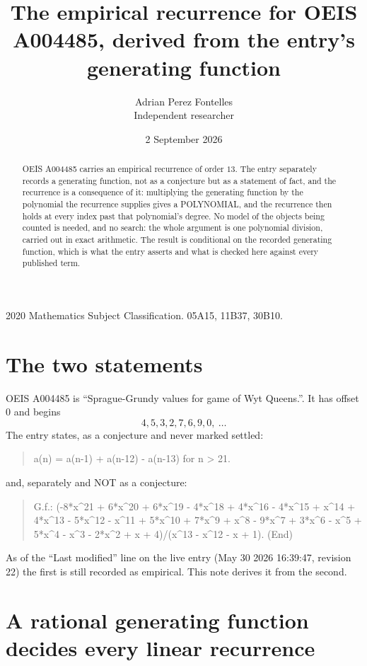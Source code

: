 \documentclass[11pt,a4paper]{article}
\title{The empirical recurrence for OEIS A004485, derived from the entry's generating function}
\author{Adrian Perez Fontelles\\ \small Independent researcher}
\date{2 September 2026}
\theoremstyle{plain}
\theoremstyle{definition}
\begin{document}
\maketitle

\begin{abstract}
OEIS A004485 carries an empirical recurrence of order $13$. The entry separately records a
generating function, not as a conjecture but as a statement of fact, and the recurrence is a
consequence of it: multiplying the generating function by the polynomial the recurrence
supplies gives a POLYNOMIAL, and the recurrence then holds at every index past that
polynomial's degree. No model of the objects being counted is needed, and no search: the
whole argument is one polynomial division, carried out in exact arithmetic. The result is
conditional on the recorded generating function, which is what the entry asserts and what is
checked here against every published term.
\end{abstract}

\noindent\small 2020 Mathematics Subject Classification. 05A15, 11B37, 30B10.\normalsize

\section{The two statements}

OEIS A004485 is ``Sprague-Grundy values for game of Wyt Queens.''. It has offset $0$ and begins
\[
4, 5, 3, 2, 7, 6, 9, 0,\ \dots
\]
The entry states, as a conjecture and never marked settled:
\begin{quote}
a(n) = a(n-1) + a(n-12) - a(n-13) for n > 21.
\end{quote}
and, separately and NOT as a conjecture:
\begin{quote}
G.f.: (-8*x\^{}21 + 6*x\^{}20 + 6*x\^{}19 - 4*x\^{}18 + 4*x\^{}16 - 4*x\^{}15 + x\^{}14 + 4*x\^{}13 - 5*x\^{}12 - x\^{}11 + 5*x\^{}10 + 7*x\^{}9 + x\^{}8 - 9*x\^{}7 + 3*x\^{}6 - x\^{}5 + 5*x\^{}4 - x\^{}3 - 2*x\^{}2 + x + 4)/(x\^{}13 - x\^{}12 - x + 1). (End)
\end{quote}
As of the ``Last modified'' line on the live entry (May 30 2026 16:39:47, revision 22) the first is still
recorded as empirical. This note derives it from the second.

\section{A rational generating function decides every linear recurrence}
\end{document}
